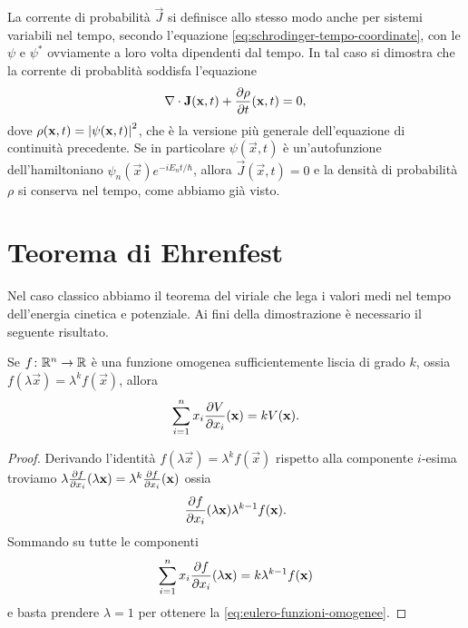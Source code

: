La corrente di probabilità $\vec J$ si definisce allo stesso modo anche per sistemi variabili nel tempo, secondo l'equazione \eqref{eq:schrodinger-tempo-coordinate}, con le $\psi$ e $\psi^*$ ovviamente a loro volta dipendenti dal tempo.
In tal caso si dimostra che la corrente di probablità soddisfa l'equazione
\begin{equation}
	\nabla\cdot\mathbf{J}(\mathbf{x},t)+\frac{\partial {\rho}}{\partial {t}}(\mathbf{x},t)=0,
	\label{eq:continuita-corrente-probabilita}
\end{equation}
dove $\rho(\mathbf{x},t)=\left|{\psi(\mathbf{x},t)}\right|^2$, che è la versione più generale dell'equazione di continuità precedente.
Se in particolare $\psi(\vec x,t)$ è un'autofunzione dell'hamiltoniano $\psi_n(\vec x)e^{-iE_nt/\hbar}$, allora $\vec J(\vec x,t)=0$ e la densità di probabilità $\rho$ si conserva nel tempo, come abbiamo già visto.

\section{Teorema di Ehrenfest}
Nel caso classico abbiamo il teorema del viriale che lega i valori medi nel tempo dell'energia cinetica e potenziale.
Ai fini della dimostrazione è necessario il seguente risultato.
\begin{teorema}[Eulero] \label{t:eulero-funzioni-omogenee}
	Se $f\colon\mathbb{R}^n\to\mathbb{R}$ è una funzione omogenea sufficientemente liscia di grado $k$, ossia $f(\lambda\vec x)=\lambda^kf(\vec x)$, allora
	\begin{equation}
		\sum_{i=1}^nx_i\frac{\partial {V}}{\partial {x_i}}(\mathbf{x})=kV(\mathbf{x}).
		\label{eq:eulero-funzioni-omogenee}
	\end{equation}
\end{teorema}
\begin{proof}
	Derivando l'identità $f(\lambda\vec x)=\lambda^kf(\vec x)$ rispetto alla componente $i$-esima troviamo $\lambda\frac{\partial {f}}{\partial {x_i}}(\lambda\mathbf{x})=\lambda^k\frac{\partial {f}}{\partial {x_i}}(\mathbf{x})$ ossia
	\begin{equation}
		\frac{\partial {f}}{\partial {x_i}}(\lambda\mathbf{x})\lambda^{k-1}f(\mathbf{x}).
	\end{equation}
	Sommando su tutte le componenti
	\begin{equation}
		\sum_{i=1}^nx_i\frac{\partial {f}}{\partial {x_i}}(\lambda\mathbf{x})=k\lambda^{k-1}f(\mathbf{x})
	\end{equation}
	e basta prendere $\lambda=1$ per ottenere la \eqref{eq:eulero-funzioni-omogenee}.
\end{proof}

